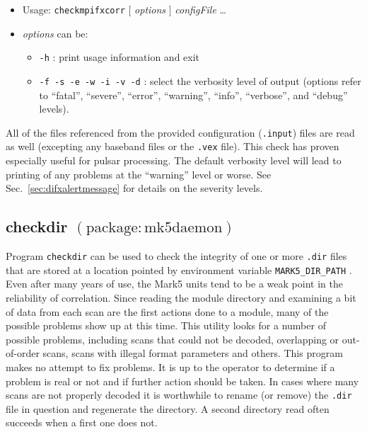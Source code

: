 \begin{itemize}
\item[] Usage: {\tt checkmpifxcorr}  $[$ {\em options} $]$ {\em configFile} \ldots
\item[] {\em options} can be:
\begin{itemize}
\item[] {\tt -h} : print usage information and exit
\item[] {\tt -f -s -e -w -i -v -d} : select the verbosity level of output (options refer to ``fatal'', ``severe'', ``error'', ``warning'', ``info'', ``verbose'', and ``debug'' levels).
\end{itemize}
\end{itemize}

All of the files referenced from the provided configuration ({\tt .input}) files are read as well (excepting any baseband files or the {\tt .vex} file).
This check has proven especially useful for pulsar processing.
The default verbosity level will lead to printing of any problems at the ``warning'' level or worse.
See Sec.~\ref{sec:difxalertmessage} for details on the severity levels.






\subsection{checkdir {\small $\mathrm{(package: mk5daemon)}$}}

Program {\tt checkdir} can be used to check the integrity of one or more {\tt .dir} files that are stored at a location pointed by environment variable {\tt MARK5\_DIR\_PATH} .
Even after many years of use, the Mark5 units tend to be a weak point in the reliability of correlation.
Since reading the module directory and examining a bit of data from each scan are the first actions done to a module, many of the possible problems show up at this time.
This utility looks for a number of possible problems, including scans that could not be decoded, overlapping or out-of-order scans, scans with illegal format parameters and others.
This program makes no attempt to fix problems.
It is up to the operator to determine if a problem is real or not and if further action should be taken.
In cases where many scans are not properly decoded it is worthwhile to rename (or remove) the {\tt .dir} file in question and regenerate the directory.  
A second directory read often succeeds when a first one does not.

